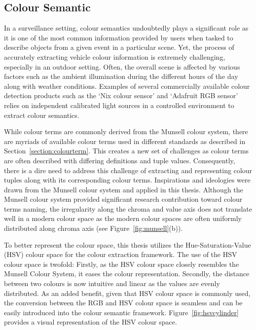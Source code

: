 \subsection{Colour Semantic}
\label{subsec:colorsemantics}

In a surveillance setting, colour semantics undoubtedly plays a significant role as it is one of the most common information provided by users when tasked to describe objects from a given event in a particular scene.
Yet, the process of accurately extracting vehicle colour information is extremely challenging, especially in an outdoor setting. Often, the overall scene is affected by various factors such as the ambient illumination during the different hours of the day along with weather conditions.
Examples of several commercially available colour detection products such as the `Nix colour sensor' \cite{nixsensorltd} and `Adafruit RGB sensor' \cite{adafruit} relies on independent calibrated light sources in a controlled environment to extract colour semantics.

While colour terms are commonly derived from the Munsell colour system, there are myriads of available colour terms used in different standards as described in Section~\ref{section:colourterm}.
This creates a new set of challenges as colour terms are often described with differing definitions and tuple values.
Consequently, there is a dire need to address this challenge of extracting and representing colour tuples along with its corresponding colour terms.
Inspirations and ideologies were drawn from the Munsell colour system and applied in this thesis.
Although the Munsell colour system provided significant research contribution toward colour terms naming, the irregularity along the chroma and value axis does not translate well in a modern colour space as the modern colour spaces are often uniformly distributed along chroma axis (see Figure~\ref{fig:munsell}(b)).

To better represent the colour space, this thesis utilizes the Hue-Saturation-Value (HSV) colour space for the colour extraction framework.
The use of the HSV colour space is twofold: Firstly, as the HSV colour space closely resembles the Munsell Colour System, it eases the colour representation.
Secondly, the distance between two colours is now intuitive and linear as the values are evenly distributed.
As an added benefit, given that HSV colour space is commonly used, the conversion between the RGB and HSV colour space is seamless and can be easily introduced into the colour semantic framework. Figure~\ref{fig:hsvcylinder} provides a visual representation of the HSV colour space.

